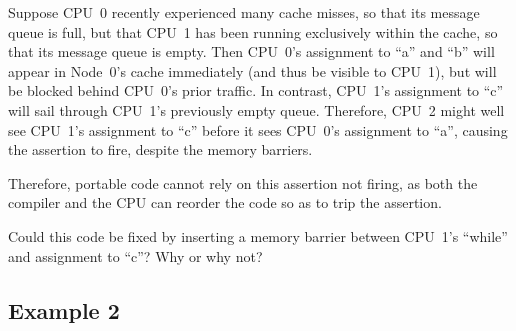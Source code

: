 \begin{table*}
\small
{}
\caption{Memory Barrier Example 1}
\label{tab:app:whymb:Memory Barrier Example 1}
\end{table*}

Suppose CPU~0 recently experienced many cache misses, so that its
message queue is full, but that CPU~1 has been running exclusively within
the cache, so that its message queue is empty.
Then CPU~0's assignment to ``a'' and ``b'' will appear in Node~0's cache
immediately (and thus be visible to CPU~1), but will be blocked behind
CPU~0's prior traffic.
In contrast, CPU~1's assignment to ``c'' will sail through CPU~1's
previously empty queue.
Therefore, CPU~2 might well see CPU~1's assignment to ``c'' before
it sees CPU~0's assignment to ``a'', causing the assertion to fire,
despite the memory barriers.

Therefore, portable code cannot rely on this assertion not firing,
as both the compiler and the CPU can reorder the code so as to trip
the assertion.

\QuickQuiz{}
	Could this code be fixed by inserting a memory barrier
	between CPU~1's ``while'' and assignment to ``c''?
	Why or why not?
 \QuickQuizEnd

\subsection{Example 2}
\label{sec:app:whymb:Example 2}

